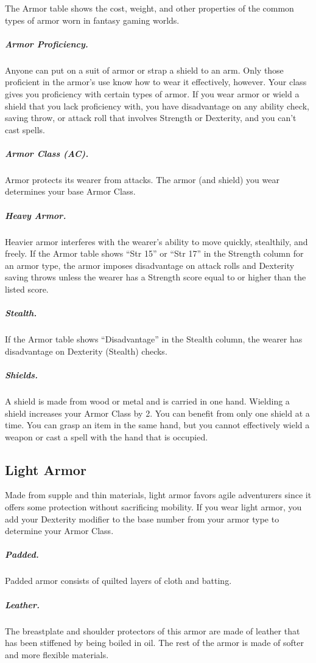 The Armor table shows the cost, weight, and other properties of the common types of armor worn in fantasy gaming worlds.

\subparagraph*{Armor Proficiency.} Anyone can put on a suit of armor or strap a shield to an arm. Only those proficient in the armor's use know how to wear it effectively, however. Your class gives you proficiency with certain types of armor. If you wear armor or wield a shield that you lack proficiency with, you have disadvantage on any ability check, saving throw, or attack roll that involves Strength or Dexterity, and you can't cast spells.

\subparagraph*{Armor Class (AC).} Armor protects its wearer from attacks. The armor (and shield) you wear determines your base Armor Class.

\subparagraph*{Heavy Armor.} Heavier armor interferes with the wearer's ability to move quickly, stealthily, and freely. If the Armor table shows “Str 15” or “Str 17” in the Strength column for an armor type, the armor imposes disadvantage on attack rolls and Dexterity saving throws unless the wearer has a Strength score equal to or higher than the listed score.

\subparagraph*{Stealth.} If the Armor table shows “Disadvantage” in the Stealth column, the wearer has disadvantage on Dexterity (Stealth) checks.

\subparagraph*{Shields.} A shield is made from wood or metal and is carried in one hand. Wielding a shield increases your Armor Class by 2. You can benefit from only one shield at a time. You can grasp an item in the same hand, but you cannot effectively wield a weapon or cast a spell with the hand that is occupied.

\subsection{Light Armor}

Made from supple and thin materials, light armor favors agile adventurers since it offers some protection without sacrificing mobility. If you wear light armor, you add your Dexterity modifier to the base number from your armor type to determine your Armor Class.

\subparagraph*{Padded.} Padded armor consists of quilted layers of cloth and batting.

\subparagraph*{Leather.} The breastplate and shoulder protectors of this armor are made of leather that has been stiffened by being boiled in oil. The rest of the armor is made of softer and more flexible materials.

